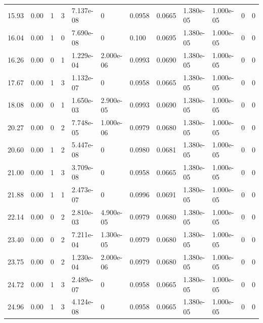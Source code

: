 \documentclass[preview]{standalone}
\begin{document}
{{\begin{tabular}{L{1.2cm}C{1.2cm} C{0.3cm}C{0.5cm} C{1.4cm}C{1.4cm} C{1.4cm}C{1.4cm} C{1.6cm}C{1.6cm} C{1.6cm}C{1.6cm}}
  15.93  &  0.00  & 1     &  3 &  7.137e-08  & 0  &  0.0958&   0.0665& 1.380e-05 & 1.000e-05   &  0 & 0  \\ 
  16.04  &  0.00  & 1     &  0 &  7.690e-08  & 0  &  0.100&   0.0695& 1.380e-05 & 1.000e-05   &  0 & 0  \\ 
  16.26  &  0.00  & 0     &  1 &  1.229e-04  & 2.000e-06  &  0.0993&   0.0690& 1.380e-05 & 1.000e-05   &  0 & 0  \\ 
  17.67  &  0.00  & 1     &  3 &  1.132e-07  & 0  &  0.0958&   0.0665& 1.380e-05 & 1.000e-05   &  0 & 0  \\ 
  18.08  &  0.00  & 0     &  1 &  1.650e-03  & 2.900e-05  &  0.0993&   0.0690& 1.380e-05 & 1.000e-05   &  0 & 0  \\ 
  20.27  &  0.00  & 0     &  2 &  7.748e-05  & 1.000e-06  &  0.0979&   0.0680& 1.380e-05 & 1.000e-05   &  0 & 0  \\ 
  20.60  &  0.00  & 1     &  2 &  5.447e-08  & 0  &  0.0980&   0.0681& 1.380e-05 & 1.000e-05   &  0 & 0  \\ 
  21.00  &  0.00  & 1     &  3 &  3.709e-08  & 0  &  0.0958&   0.0665& 1.380e-05 & 1.000e-05   &  0 & 0  \\ 
  21.88  &  0.00  & 1     &  1 &  2.473e-07  & 0  &  0.0996&   0.0691& 1.380e-05 & 1.000e-05   &  0 & 0  \\ 
  22.14  &  0.00  & 0     &  2 &  2.810e-03  & 4.900e-05  &  0.0979&   0.0680& 1.380e-05 & 1.000e-05   &  0 & 0  \\ 
  23.40  &  0.00  & 0     &  2 &  7.211e-04  & 1.300e-05  &  0.0979&   0.0680& 1.380e-05 & 1.000e-05   &  0 & 0  \\ 
  23.75  &  0.00  & 0     &  2 &  1.230e-04  & 2.000e-06  &  0.0979&   0.0680& 1.380e-05 & 1.000e-05   &  0 & 0  \\ 
  24.72  &  0.00  & 1     &  3 &  2.489e-07  & 0  &  0.0958&   0.0665& 1.380e-05 & 1.000e-05   &  0 & 0  \\ 
  24.96  &  0.00  & 1     &  3 &  4.124e-08  & 0  &  0.0958&   0.0665& 1.380e-05 & 1.000e-05   &  0 & 0  \\ 
\hline 
\end{tabular} 

}}
\end{document}
